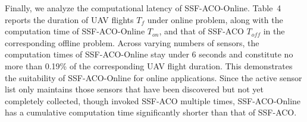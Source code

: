 \begin{revresponse}

	\begin{changes}
		Finally, we analyze the computational latency of SSF-ACO-Online.
		Table~4 reports the duration of UAV flights $T_f$ under online problem, along with the computation time of SSF-ACO-Online $T_{on}$, and that of SSF-ACO $T_{off}$ in the corresponding offline problem.
		Across varying numbers of sensors, the computation times of SSF-ACO-Online stay under 6 seconds and constitute no more than 0.19\% of the corresponding UAV flight duration.
		This demonstrates the suitability of SSF-ACO-Online for online applications.
		Since the active sensor list only maintains those sensors that have been discovered but not yet completely collected, though invoked SSF-ACO multiple times, SSF-ACO-Online has a cumulative computation time significantly shorter than that of SSF-ACO.
	\end{changes}
\end{revresponse}

